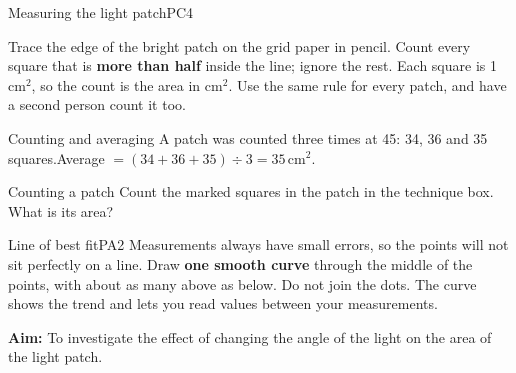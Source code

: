 
\begin{technique}{Measuring the light patch}{PC4}
\begin{minipage}[c]{0.6\linewidth}
Trace the edge of the bright patch on the grid paper in pencil. Count every square that is \textbf{more than half} inside the line; ignore the rest. Each square is 1\,cm$^2$, so the count is the area in cm$^2$. Use the same rule for every patch, and have a second person count it too.
\end{minipage}\hfill
\begin{minipage}[c]{0.36\linewidth}\centering
{}
\end{minipage}
\end{technique}

\begin{workedex}{Counting and averaging}
A patch was counted three times at 45\textdegree: 34, 36 and 35 squares.\qquad Average $= (34 + 36 + 35) \div 3 = 35$\,cm$^2$.
\end{workedex}

\begin{wedo}{Counting a patch}
Count the marked squares in the patch in the technique box. What is its area?
\answerbox{2cm}
\end{wedo}

\begin{technique}{Line of best fit}{PA2}
Measurements always have small errors, so the points will not sit perfectly on a line. Draw \textbf{one smooth curve} through the middle of the points, with about as many above as below. Do not join the dots. The curve shows the trend and lets you read values between your measurements.
\end{technique}


\textbf{Aim:} To investigate the effect of changing the angle of the light on the area of the light patch.

